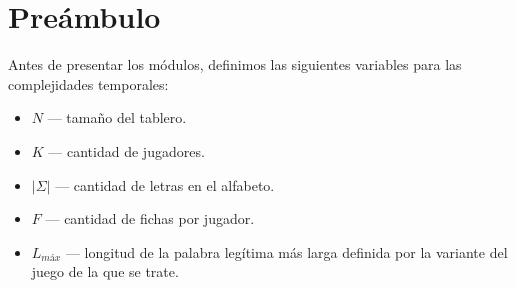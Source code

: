 \section{Preámbulo}
Antes de presentar los módulos, definimos las siguientes variables para las complejidades temporales:
\begin{itemize}
    \item $N$ \---- tamaño del tablero.
    \item $K$ \---- cantidad de jugadores.
    \item $|\Sigma|$ \---- cantidad de letras en el alfabeto.
    \item $F$ \---- cantidad de fichas por jugador.
    \item $L_{máx}$ \---- longitud de la palabra legítima más larga definida por la variante del juego de la que se trate.
\end{itemize}

